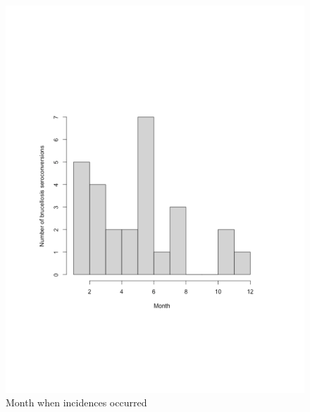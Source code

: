 \documentclass[letterpaper,12pt]{article}
\begin{document}
\begin{figure}
\begin{center}
\includegraphics[width=5.5in]{Bruc_conversion_month}
\end{center}
\caption{Month when incidences occurred}
\label{fig4}
\end{figure}




\pagebreak
\end{document}
